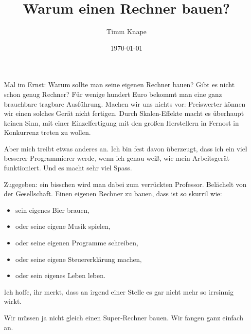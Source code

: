 \documentclass[a5paper,ngerman]{article}
\title{\color{emph}Warum einen Rechner bauen?}
\author{Timm Knape}
\date{\today}
\begin{document}
\pagecolor{background}
\color{normal}
\allsectionsfont{\color{emph}\mdseries}
\pagestyle{plain}
\maketitle
\thispagestyle{fancy}
\begin{multicols}{2}

Mal im Ernst:
Warum sollte man seine eigenen Rechner bauen?
Gibt es nicht schon genug Rechner?
Für wenige hundert Euro bekommt man eine ganz brauchbare tragbare
Ausführung.
Machen wir uns nichts vor:
Preiswerter können wir einen solches Gerät nicht fertigen.
Durch Skalen-Effekte macht es überhaupt keinen Sinn,
mit einer Einzelfertigung mit den großen Herstellern in Fernost
in Konkurrenz treten zu wollen.

Aber mich treibt etwas anderes an.
Ich bin fest davon überzeugt,
dass ich ein viel besserer Programmierer werde,
wenn ich genau weiß, wie mein Arbeitsgerät funktioniert.
Und es macht sehr viel Spass.

Zugegeben: ein bisschen wird man dabei zum verrückten Professor.
Belächelt von der Gesellschaft.
Einen eigenen Rechner zu bauen, dass ist so skurril wie:

\begin{itemize}
\item sein eigenes Bier brauen,
\item oder seine eigene Musik spielen,
\item oder seine eigenen Programme schreiben,
\item oder seine eigene Steuererklärung machen,
\item oder sein eigenes Leben leben.
\end{itemize}

Ich hoffe, ihr merkt, dass an irgend einer Stelle es gar nicht mehr so
irrsinnig wirkt.

Wir müssen ja nicht gleich einen Super-Rechner bauen.
Wir fangen ganz einfach an.

\end{multicols}
\end{document}
